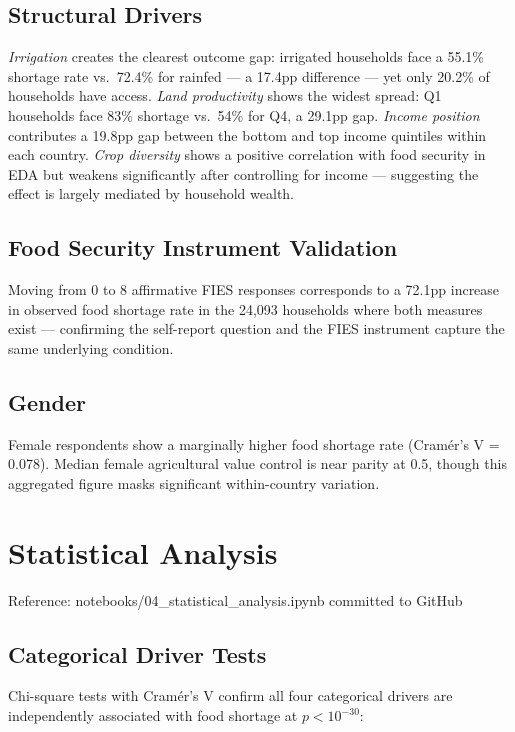 \documentclass[11pt,a4paper]{article}
\newcommand{\nb}[1]{\vspace{2pt}\begin{refbox}Reference: #1\end{refbox}\vspace{3pt}}
\begin{document}
\subsection{Structural Drivers}

\textit{Irrigation} creates the clearest outcome gap: irrigated households face a 55.1\% shortage rate vs.\ 72.4\% for rainfed — a 17.4pp difference — yet only 20.2\% of households have access. \textit{Land productivity} shows the widest spread: Q1 households face 83\% shortage vs.\ 54\% for Q4, a 29.1pp gap. \textit{Income position} contributes a 19.8pp gap between the bottom and top income quintiles within each country. \textit{Crop diversity} shows a positive correlation with food security in EDA but weakens significantly after controlling for income — suggesting the effect is largely mediated by household wealth.

\subsection{Food Security Instrument Validation}

Moving from 0 to 8 affirmative FIES responses corresponds to a 72.1pp increase in observed food shortage rate in the 24,093 households where both measures exist — confirming the self-report question and the FIES instrument capture the same underlying condition.

\subsection{Gender}

Female respondents show a marginally higher food shortage rate (Cramér's V = 0.078). Median female agricultural value control is near parity at 0.5, though this aggregated figure masks significant within-country variation.

\section{Statistical Analysis}

\nb{notebooks/04\_statistical\_analysis.ipynb committed to GitHub}

\subsection{Categorical Driver Tests}

Chi-square tests with Cramér's V confirm all four categorical drivers are independently associated with food shortage at $p < 10^{-30}$:
\end{document}
